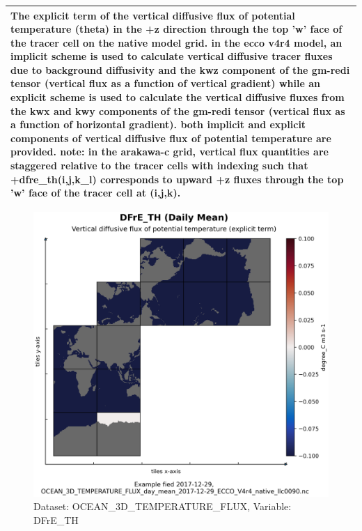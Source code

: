 \begin{longtable}{|m{}|m{}|m{}|m{}|}
\multicolumn{4}{|p{1\textwidth}|}{The explicit term of the vertical diffusive flux of potential temperature (theta) in the +z direction through the top 'w' face of the tracer cell on the native model grid. in the ecco v4r4 model, an implicit scheme is used to calculate vertical diffusive tracer fluxes due to background diffusivity and the kwz component of the gm-redi tensor (vertical flux as a function of vertical gradient) while an explicit scheme is used to calculate the vertical diffusive fluxes from the kwx and kwy components of the gm-redi tensor (vertical flux as a function of horizontal gradient). both implicit and explicit components of vertical diffusive flux of potential temperature are provided. note: in the arakawa-c grid, vertical flux quantities are staggered relative to the tracer cells with indexing such that +dfre\_th(i,j,k\_l) corresponds to upward +z fluxes through the top 'w' face of the tracer cell at (i,j,k).} \\ \hline
\end{longtable}

\begin{figure}[H]
\centering
\includegraphics[scale=0.55]{../images/plots/native_plots/Ocean_Three-Dimensional_Potential_Temperature_Fluxes/DFrE_TH.png}
\caption{Dataset: OCEAN\_3D\_TEMPERATURE\_FLUX, Variable: DFrE\_TH}
\label{tab:table-OCEAN_3D_TEMPERATURE_FLUX_DFrE_TH-Plot}
\end{figure}
\pagebreak
